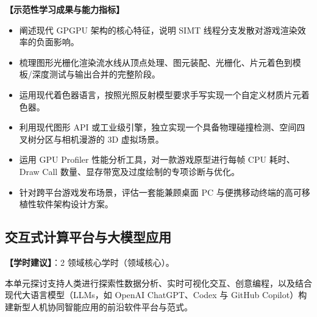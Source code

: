 \textbf{【示范性学习成果与能力指标】}
\begin{itemize}
    \item 阐述现代 GPGPU 架构的核心特征，说明 SIMT 线程分支发散对游戏渲染效率的负面影响。
    \item 梳理图形光栅化渲染流水线从顶点处理、图元装配、光栅化、片元着色到模板/深度测试与输出合并的完整阶段。
    \item 运用现代着色器语言，按照光照反射模型要求手写实现一个自定义材质片元着色器。
    \item 利用现代图形 API 或工业级引擎，独立实现一个具备物理碰撞检测、空间四叉树分区与相机漫游的 3D 虚拟场景。
    \item 运用 GPU Profiler 性能分析工具，对一款游戏原型进行每帧 CPU 耗时、Draw Call 数量、显存带宽及过度绘制的专项诊断与优化。
    \item 针对跨平台游戏发布场景，评估一套能兼顾桌面 PC 与便携移动终端的高可移植性软件架构设计方案。
\end{itemize}

\subsection{交互式计算平台与大模型应用}
\textbf{【学时建议】}：2 领域核心学时（领域核心）。

本单元探讨支持人类进行探索性数据分析、实时可视化交互、创意编程，以及结合现代大语言模型（LLMs，如 OpenAI ChatGPT、Codex 与 GitHub Copilot）构建新型人机协同智能应用的前沿软件平台与范式。

